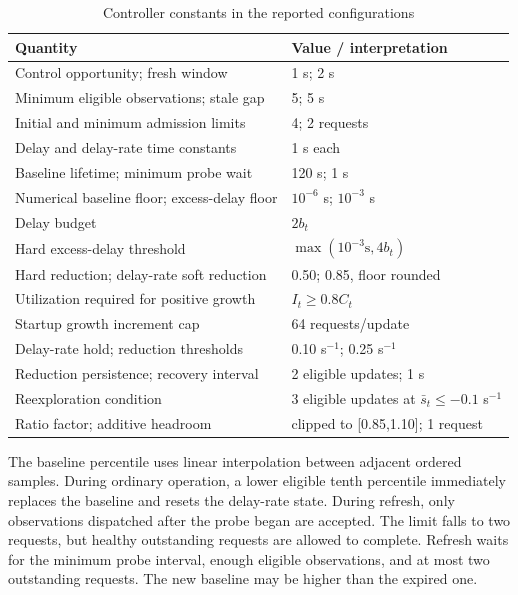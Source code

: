 \documentclass[10pt]{article}
\begin{document}
\begin{table}[h]\centering\small
\caption{Controller constants in the reported configurations}
\begin{tabular}{p{.46\linewidth}p{.42\linewidth}}\toprule
Quantity & Value / interpretation\\\midrule
Control opportunity; fresh window & 1 s; 2 s\\
Minimum eligible observations; stale gap & 5; 5 s\\
Initial and minimum admission limits & 4; 2 requests\\
Delay and delay-rate time constants & 1 s each\\
Baseline lifetime; minimum probe wait & 120 s; 1 s\\
Numerical baseline floor; excess-delay floor & $10^{-6}$ s; $10^{-3}$ s\\
Delay budget & $2b_t$\\
Hard excess-delay threshold & $\max(10^{-3}\mathrm{s},4b_t)$\\
Hard reduction; delay-rate soft reduction & 0.50; 0.85, floor rounded\\
Utilization required for positive growth & $I_t\geq0.8C_t$\\
Startup growth increment cap & 64 requests/update\\
Delay-rate hold; reduction thresholds & 0.10 s$^{-1}$; 0.25 s$^{-1}$\\
Reduction persistence; recovery interval & 2 eligible updates; 1 s\\
Reexploration condition & 3 eligible updates at $\bar s_t\leq-0.1$ s$^{-1}$\\
Ratio factor; additive headroom & clipped to [0.85,1.10]; 1 request\\\bottomrule
\end{tabular}\end{table}
The baseline percentile uses linear interpolation between adjacent ordered samples. During ordinary operation, a lower eligible tenth percentile immediately replaces the baseline and resets the delay-rate state. During refresh, only observations dispatched after the probe began are accepted. The limit falls to two requests, but healthy outstanding requests are allowed to complete. Refresh waits for the minimum probe interval, enough eligible observations, and at most two outstanding requests. The new baseline may be higher than the expired one.
\end{document}
